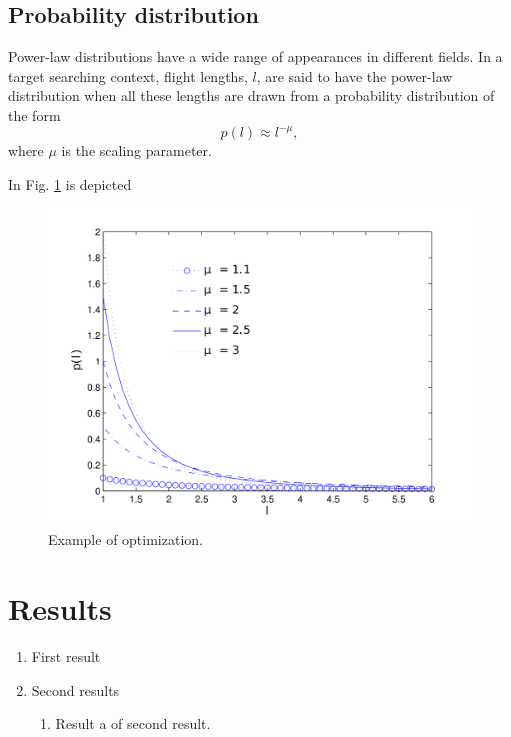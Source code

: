 \documentclass[journal,onecolumn,twoside]{IEEEtran}
\begin{document}
\subsection{Probability distribution}

Power-law distributions have a wide range of appearances in different fields.
In a target searching context, flight lengths, $l$, are said to have the power-law
distribution when all these lengths are drawn from a probability distribution of the form
\begin{equation}
  p(l) \approx l^{-\mu},   
\end{equation}
where $\mu$ is the scaling parameter.


In Fig. \ref{fig:c1} is depicted

\begin{figure}[t]
\centering
\includegraphics[scale=1]{g12.png}
\caption{Example of optimization.}
\label{fig:c1}
\end{figure}


\section{Results}
\label{results}

\begin{enumerate}
    \item First result
    \item Second results
    \begin{enumerate}
        \item Result a of second result.
    \end{enumerate}
\end{enumerate}
\end{document}
